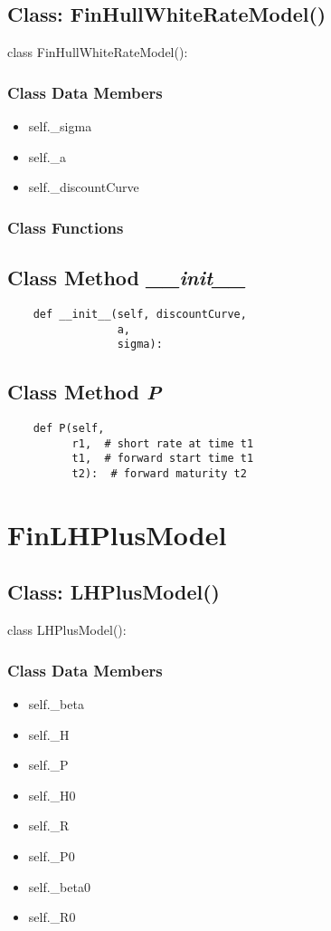 \documentclass[twoside,11pt]{book}
\begin{document}
\subsection{Class: FinHullWhiteRateModel()}
class FinHullWhiteRateModel():

\subsubsection{Class Data Members}
\begin{itemize}
\item{self.\_sigma}
\item{self.\_a}
\item{self.\_discountCurve}
\end{itemize}

\subsubsection{Class Functions}

\subsection{Class Method {\it \_\_init\_\_}}


\begin{lstlisting}
    def __init__(self, discountCurve,
                 a,
                 sigma):
\end{lstlisting}

\subsection{Class Method {\it P}}


\begin{lstlisting}
    def P(self,
          r1,  # short rate at time t1
          t1,  # forward start time t1
          t2):  # forward maturity t2
\end{lstlisting}

\newpage
\section{FinLHPlusModel}

\subsection{Class: LHPlusModel()}
class LHPlusModel():

\subsubsection{Class Data Members}
\begin{itemize}
\item{self.\_beta}
\item{self.\_H}
\item{self.\_P}
\item{self.\_H0}
\item{self.\_R}
\item{self.\_P0}
\item{self.\_beta0}
\item{self.\_R0}
\end{itemize}
\end{document}
